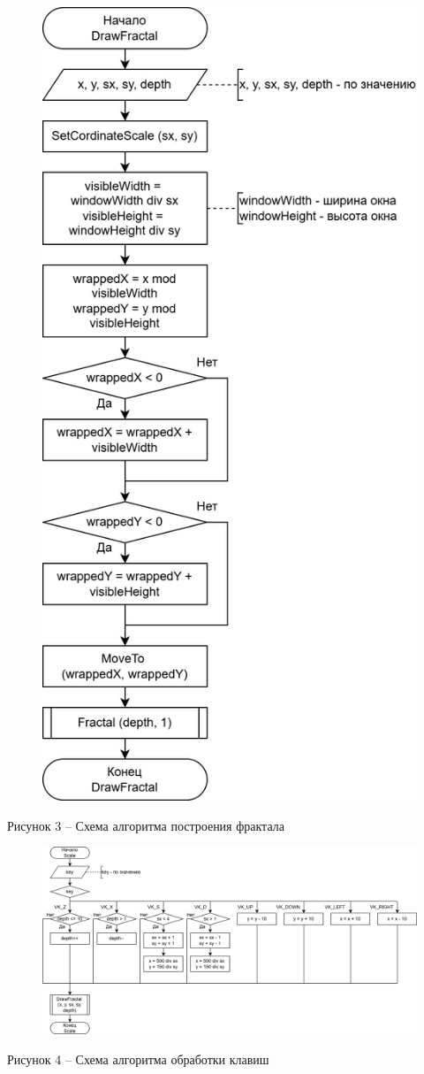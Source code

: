 \documentclass[a4paper,14pt]{extarticle}
\begin{document}
  \begin{figure}[h]
    \centering
    \includegraphics[width=0.55\linewidth]{images/s-3}
  \end{figure}
  \begin{center}
    Рисунок 3 – Схема алгоритма построения фрактала
  \end{center}

  \pagebreak

  \begin{figure}[h]
    \centering
    \includegraphics[width=1\linewidth]{images/s-4}
  \end{figure}
  \begin{center}
    Рисунок 4 – Схема алгоритма обработки клавиш
  \end{center}
\end{document}

